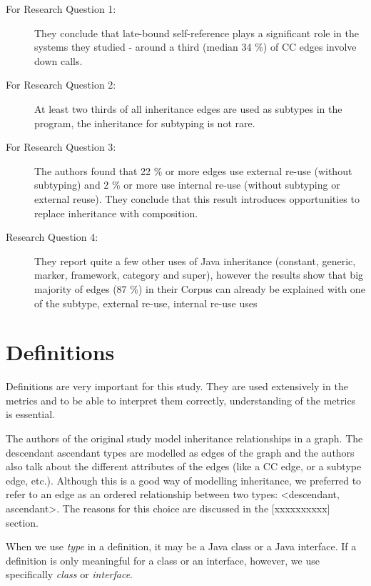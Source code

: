 \documentclass{uvamscse}
\begin{document}
\begin{description}
\item [For Research Question 1:] They conclude that late-bound self-reference plays a significant role in the systems they studied - around a third (median 34 \%) of CC edges involve down calls.

\item [For Research Question 2:] At least two thirds of all inheritance edges are used as subtypes in the program, the inheritance for subtyping is not rare.

\item[For Research Question 3:] The authors found that 22 \% or more edges use external re-use (without subtyping) and 2 \% or more use internal re-use (without subtyping or external reuse). They conclude that this result introduces opportunities to replace inheritance with composition. 


\item[Research Question 4:] They report quite a few other uses of Java inheritance (constant, generic, marker, framework, category and super), however the results show that big majority of edges (87 \%) in their Corpus can already be explained with one of the subtype, external re-use, internal re-use uses 

\end{description}







\chapter{Definitions}
Definitions are very important for this study. They are used extensively in the metrics and to be able to interpret them correctly, understanding of the metrics is essential. 

The authors of the original study model inheritance relationships in a graph. The descendant ascendant types are modelled as edges of the graph and the authors also talk about the different attributes of the edges (like a CC edge, or a subtype edge, etc.). Although this is a good way of modelling inheritance, we preferred to refer to an edge as an ordered relationship between two types: <descendant, ascendant>. The reasons for this choice are discussed in the [xxxxxxxxxx] section.

When we use \emph{type} in a definition, it may be a Java class or a Java interface.  If a definition is only meaningful for a class or an interface, however, we use specifically \emph{class} or \emph{interface}.
\end{document}
